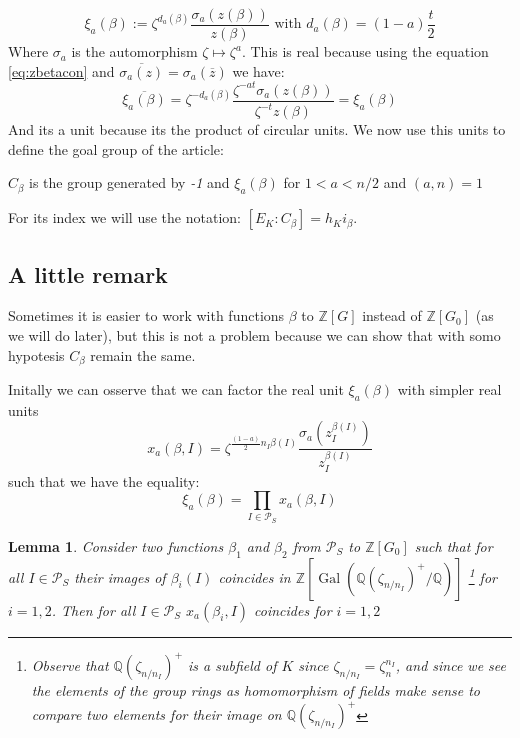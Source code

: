 \documentclass[]{article}
\theoremstyle{plain}
\newtheorem{lem}[teo]{Lemma}
\theoremstyle{remark}
\theoremstyle{definition}
\newcommand{\PS}{\mathcal{P}_S}
\newcommand{\Z}{\mathbb{Z}}
\newcommand{\Q}{\mathbb{Q}}
\DeclareMathOperator{\Gal}{Gal}
\begin{document}
	\begin{equation}\label{eq:xi}
		\xi_a (\beta) := \zeta ^{d_a (\beta)} \frac{\sigma_a (z(\beta))}{z(\beta)} \text{ with } d_a(\beta)= (1-a)\frac{t}{2}
	\end{equation}
	Where $\sigma_a$ is the automorphism $ \zeta \mapsto \zeta ^a $. This is real because using the equation \ref{eq:zbetacon} and $ \overline{\sigma_a(z)}= \sigma_a(\overline{z}) $ we have:
	\begin{equation}
		\overline{\xi_a(\beta)} = \zeta ^{-d_a(\beta)} \frac{\zeta^{-at} \sigma_a (z(\beta))}{\zeta^{-t} z(\beta)} = \xi_a(\beta)
	\end{equation}
 	And its a unit because its the product of circular units. %
 	We now use this units to define the goal group of the article:
 	\begin{tcolorbox}
 		$C_\beta $ is the group generated by \textit{-1} and $ \xi_a (\beta) $ for $ 1< a< n/2 $ and $ (a,n)=1 $
 	\end{tcolorbox}
 	For its index we will use the notation: $ [E_K : C_\beta] = h_K i_\beta $. 

	\subsection{A little remark}
	
	Sometimes it is easier to work with functions $\beta$ to $ \Z [G] $ instead of $ \Z [G_0] $ (as we will do later), but this is not a problem because we can show that with somo hypotesis $ C_\beta $ remain the same. 
	
	Initally we can osserve that we can factor the real unit $\xi_a(\beta)$ with simpler real units
	\begin{equation*}
		x_a(\beta , I) = \zeta ^{\frac{(1-a)}{2} n_I \beta (I)} \frac{\sigma_a (	z_I ^{\beta(I)})}{z_I ^{\beta(I)}} 
	\end{equation*}
	such that we have the equality:
	\begin{equation}\label{eq:fact_xi}
		 \xi_a(\beta) = \prod_{I \in \PS}  x_a(\beta , I)
	\end{equation} 
	
	\begin{lem} \label{lem:gooddef}
		Consider two functions $ \beta_1 $ and $ \beta_2 $ from $ \PS $ to $ \Z[G_0] $ such that for all $ I \in \PS $ their images of $ \beta_i (I)$ coincides in $ \Z[\Gal( \Q(\zeta_{n/n_I})^+ / \Q )] $ \footnote{Observe that $ \Q(\zeta_{n/n_I})^+ $ is a subfield of $ K $ since $ \zeta_{n/n_I} =  \zeta_n^{n_I}$, and since we see the elements of the group rings as homomorphism of fields make sense to compare two elements for their image on $\Q(\zeta_{n/n_I})^+ $ %
		} for $ i= 1,2 $. Then for all $ I \in \PS $ $ x_a(\beta_i, I) $ coincides for $ i=1,2 $
	\end{lem}
\end{document}
